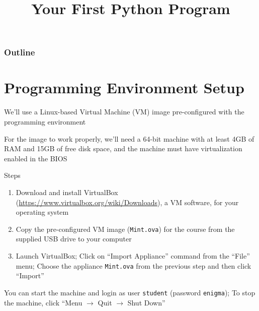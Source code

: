 \documentclass[8pt,a4paper,compress]{beamer}
\title{Your First Python Program}
\date{}
\begin{document}
\begin{frame}
\vfill
\titlepage
\end{frame}

\begin{frame}
\frametitle{Outline}
\tableofcontents
\end{frame}

\section{Programming Environment Setup}
\begin{frame}[fragile]
We'll use a Linux-based Virtual Machine (VM) image pre-configured with the programming environment

\bigskip

For the image to work properly, we'll need a 64-bit machine with at least 4GB of RAM and 15GB of free disk space, and the machine must have virtualization enabled in the BIOS
 
\bigskip

Steps
\begin{enumerate}
\item Download and install VirtualBox (\href{https://www.virtualbox.org/wiki/Downloads}{https://www.virtualbox.org/wiki/Downloads}), a VM software, for your operating system
\item Copy the pre-configured VM image (\lstinline$Mint.ova$) for the course from the supplied USB drive to your computer
\item Launch VirtualBox; Click on ``Import Appliance'' command from the ``File'' menu; Choose the appliance \lstinline{Mint.ova} from the previous step and then click ``Import''
\end{enumerate}

\bigskip

You can start the machine and login as user \lstinline{student} (password \lstinline{enigma}); To stop the machine, click ``Menu $\to$ Quit $\to$ Shut Down''
\end{frame}
\end{document}
